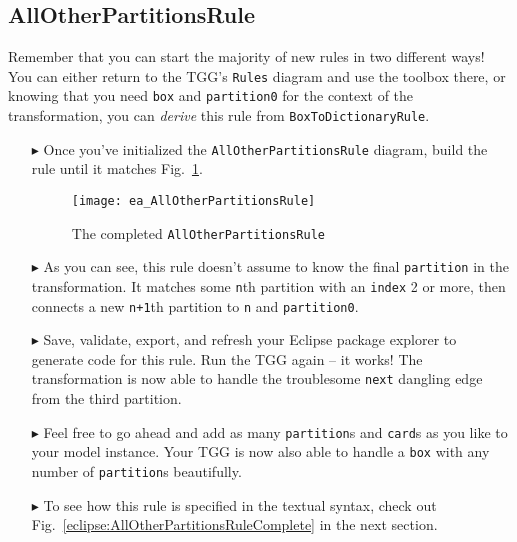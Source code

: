 \newpage
\hypertarget{allCards vis}{}
\subsection{AllOtherPartitionsRule}
\visHeader

Remember that you can start the majority of new rules in two different ways! You can either return to the TGG's \texttt{Rules} diagram and use the toolbox
there, or knowing that you need \texttt{box} and \texttt{partition0} for the context of the transformation, you can \emph{derive} this rule from 
\texttt{BoxToDictionaryRule}.

\begin{itemize}

\item[$\blacktriangleright$] Once you've initialized the \texttt{AllOtherPartitionsRule} diagram, build the rule until it matches
Fig.~\ref{fig:ea_AllOtherPartitionsRuleComplete}.

\begin{figure}[htbp]
\begin{center}
  \texttt{[image: ea\_AllOtherPartitionsRule]}
  \caption{The completed \texttt{AllOtherPartitionsRule}}
  \label{fig:ea_AllOtherPartitionsRuleComplete}
\end{center}
\end{figure}

\item[$\blacktriangleright$] As you can see, this rule doesn't assume to know the final \texttt{partition} in the transformation. It matches some
\texttt{n}th partition with an \texttt{index} 2 or more, then connects a new \texttt{n+1}th partition to \texttt{n} and \texttt{partition0}. 

\item[$\blacktriangleright$] Save, validate, export, and refresh your Eclipse package explorer to generate code for this rule. Run the TGG again -- it works!
The transformation is now able to handle the troublesome \texttt{next} dangling edge from the third partition.

\item[$\blacktriangleright$] Feel free to go ahead and add as many \texttt{partition}s and \texttt{card}s as you like to your model instance.
Your TGG is now
also able to handle a \texttt{box} with any number of \texttt{partition}s beautifully. 

\item[$\blacktriangleright$] To see how this rule is specified in the textual syntax, check out Fig.~\ref{eclipse:AllOtherPartitionsRuleComplete} in the next
section.


\end{itemize}
